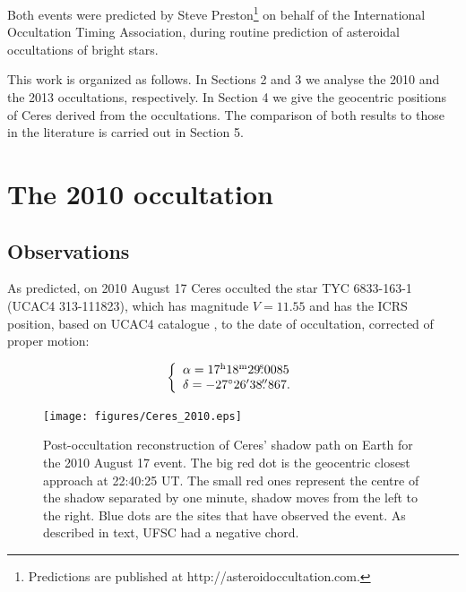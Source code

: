 \documentclass[useAMS,usenatbib]{mn2e}
\begin{document}
Both events were predicted by Steve Preston\footnote{Predictions are published at http://asteroidoccultation.com.} on behalf of the International Occultation Timing Association, during routine prediction of asteroidal occultations of bright stars.

This work is organized as follows. In Sections 2 and 3 we analyse the 2010 and the 2013 occultations, respectively. In Section 4 we give the geocentric positions of Ceres derived from the occultations. The comparison of both results to those in the literature is carried out in Section 5.



\section{The 2010 occultation}

\subsection{Observations}


As predicted, on 2010 August 17 Ceres occulted the star TYC 6833-163-1 (UCAC4 313-111823), which has magnitude $V = 11.55$ and has the ICRS position, based on UCAC4 catalogue \citep{Zacharias2013}, to the date of occultation, corrected of proper motion:

\begin{equation}
\left\{ 
  \begin{array}{l l}
    \alpha = 17^{\rmn{h}}18^{\rmn{m}}29\fs0085\\
    \delta = -27\degr 26\arcmin 38\farcs 867.
  \end{array}
\right.
\label{Eq: 2010-coord}
\end{equation}

%
%

\begin{figure}
\texttt{[image: figures/Ceres\_2010.eps]} 
\caption{Post-occultation reconstruction of Ceres' shadow path on Earth for the 2010 August 17 event. The big red dot is the geocentric closest approach at 22:40:25 UT. The small red ones represent the centre of the shadow separated by one minute, shadow moves from the left to the right. Blue dots are the sites that have observed the event. As described in text, UFSC had a negative chord.
\label{Fig: Ceres-2010-map}}
\end{figure}
\end{document}
